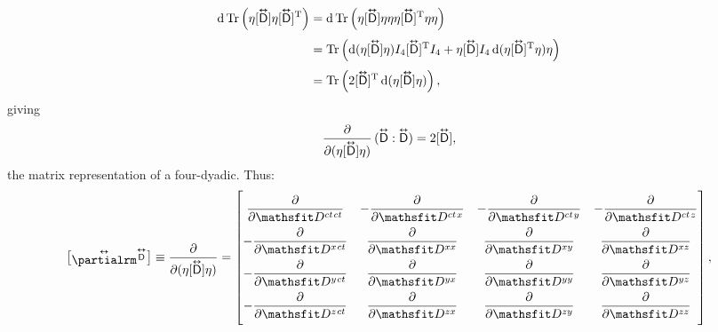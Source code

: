 \documentclass[12pt]{article}
\newcommand{\dd}[1]{\mathrm{d}#1}
\newcommand{\superoverset}[2]{%
  \mathop{#2}\limits^{\vbox to -.5ex{\kern-0.95ex\hbox{$#1$}\vss}}}
\newcommand{\superdy}[1]{\superoverset{\text{\tiny$\bm\leftrightarrow$}}{#1}}
\newcommand{\capdy}[1]{ \overset{ \text{\tiny$\bm\leftrightarrow$} }{\vphantom{\text{\small{A}}}\smash{#1}} }
\begin{document}
\begin{equation*}
\begin{aligned}
\dd \, \mathrm{Tr} \left( \eta [\capdy{\mathsf{D}}] \eta [ \capdy{\mathsf{D}} ]^{\mathrm{T}} \right) &= \dd \, \mathrm{Tr} \left( \eta [\capdy{\mathsf{D}}] \eta \eta \eta [ \capdy{\mathsf{D}} ]^{\mathrm{T}} \eta \eta \right) \\[3pt]
&= \mathrm{Tr} \left( \dd (\eta [\capdy{\mathsf{D}}] \eta ) I_4 [ \capdy{\mathsf{D}} ]^{\mathrm{T}} I_4 +  \eta [\capdy{\mathsf{D}}] I_4 \, \dd ( \eta [\capdy{\mathsf{D}}]^\mathrm{T} \eta ) \eta \right) \\[3pt]
&= \mathrm{Tr} \left( 2 [\capdy{\mathsf{D}}]^\mathrm{T} \, \dd (\eta [\capdy{\mathsf{D}}] \eta ) \right) ,
\end{aligned}
\end{equation*}
giving
\begin{equation*}
\dfrac{\partial}{\partial (\eta [ \capdy{\mathsf{D}} ] \eta)} \, ( \capdy{\mathsf{D}} : \capdy{\mathsf{D}} ) = 2 [\capdy{\mathsf{D}}],
\end{equation*}
the matrix representation of a four-dyadic. Thus:
\begin{equation*}
\begin{bmatrix}
\capdy{\partialrm} {}^{\superdy{\mathsf{D}}} \\[-.375ex]
\end{bmatrix}
\equiv
\dfrac{\partial}{\partial (\eta [ \capdy{\mathsf{D}} ] \eta)}
=
\begin{bmatrix}
\\[-2ex]
\dfrac{\partial}{\partial \mathsfit D^{ct \mkern1.5mu ct}} & -\dfrac{\partial}{\partial \mathsfit D^{ct \mkern1.5mu x}} & -\dfrac{\partial}{\partial \mathsfit D^{ct \mkern1.5mu y}} & -\dfrac{\partial}{\partial \mathsfit D^{ct \mkern1.5mu z}} \\[2ex]
-\dfrac{\partial}{\partial \mathsfit D^{x \mkern1.5mu ct}} & \dfrac{\partial}{\partial \mathsfit D^{x x}} & \dfrac{\partial}{\partial \mathsfit D^{x y}} & \dfrac{\partial}{\partial \mathsfit D^{x z}}  \\[2ex]
-\dfrac{\partial}{\partial \mathsfit D^{y \mkern1.5mu ct}} & \dfrac{\partial}{\partial \mathsfit D^{y x}} & \dfrac{\partial}{\partial \mathsfit D^{y y}} & \dfrac{\partial}{\partial \mathsfit D^{y z}}  \\[2ex]
-\dfrac{\partial}{\partial \mathsfit D^{z \mkern1.5mu ct}} & \dfrac{\partial}{\partial \mathsfit D^{z x}} & \dfrac{\partial}{\partial \mathsfit D^{z y}} & \dfrac{\partial}{\partial \mathsfit D^{z z}} \\[2ex]
\end{bmatrix} ,
\end{equation*}
\end{document}
